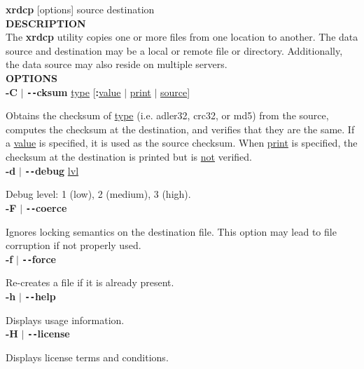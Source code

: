 \documentclass{article}
\begin{document}
		\textbf{xrdcp} [options] source destination \\
		
		\noindent \textbf{DESCRIPTION} \\
		
		\noindent  The \textbf{xrdcp} utility copies one or more files from one location to
		another. The data source and destination may be a local or remote file or directory.
		Additionally, the data source may also reside on multiple servers. \\
		
		\noindent \textbf{OPTIONS} \\
		
		\noindent \textbf{-C} $\vert$ \textbf{\texttt{-{}-}cksum} \underline{type} [\textbf{:}\underline{value} $\vert$ \underline{print} $\vert$ \underline{source}]
		
		\noindent Obtains the checksum of \underline{type} (i.e. adler32, crc32, or md5) from the source,
		computes the checksum at the destination, and verifies that they are the same. If a \underline{value}
		is specified, it is used as the source checksum. When \underline{print} is specified, the checksum at 
		the destination is printed but is \underline{not} verified. \\
		
		\noindent \textbf{-d} $\vert$ \textbf{\texttt{-{}-}debug} \underline{lvl}
		
		\noindent Debug level: 1 (low), 2 (medium), 3 (high). \\
		
		\noindent \textbf{-F} $\vert$ \textbf{\texttt{-{}-}coerce}

		\noindent Ignores locking semantics on the destination file. This option may lead to
		file corruption if not properly used. \\
		
		\noindent \textbf{-f} $\vert$ \textbf{\texttt{-{}-}force}

		\noindent Re-creates a file if it is already present. \\
		
		\noindent \textbf{-h} $\vert$ \textbf{\texttt{-{}-}help}

		\noindent Displays usage information. \\
		
		\noindent \textbf{-H} $\vert$ \textbf{\texttt{-{}-}license}

		\noindent Displays license terms and conditions. \\
		
\end{document}
